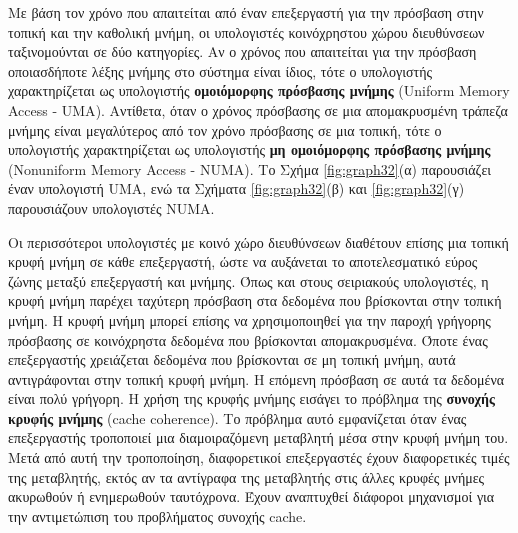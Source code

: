 \documentclass[12pt,a4paper]{article}
\begin{document}
Με βάση τον χρόνο που απαιτείται από έναν επεξεργαστή για την πρόσβαση στην 
τοπική και την καθολική μνήμη, οι υπολογιστές κοινόχρηστου χώρου διευθύνσεων 
ταξινομούνται σε δύο κατηγορίες. Αν ο χρόνος που απαιτείται για την 
πρόσβαση οποιασδήποτε λέξης μνήμης στο σύστημα είναι ίδιος, τότε ο 
υπολογιστής χαρακτηρίζεται ως υπολογιστής \textbf{ομοιόμορφης πρόσβασης 
μνήμης} (\foreignlanguage{english}{Uniform Memory Access - UMA}). Αντίθετα, όταν ο χρόνος 
πρόσβασης σε μια απομακρυσμένη τράπεζα μνήμης είναι μεγαλύτερος από τον 
χρόνο πρόσβασης σε μια τοπική, τότε ο υπολογιστής χαρακτηρίζεται ως 
υπολογιστής \textbf{μη ομοιόμορφης πρόσβασης μνήμης} (\foreignlanguage{english}{Nonuniform 
Memory Access - NUMA}). Το Σχήμα \ref{fig:graph32}(α) παρουσιάζει έναν υπολογιστή \foreignlanguage{english}{UMA}, 
ενώ τα Σχήματα \ref{fig:graph32}(β) και \ref{fig:graph32}(γ) παρουσιάζουν υπολογιστές \foreignlanguage{english}{NUMA}.

Οι περισσότεροι υπολογιστές με κοινό χώρο διευθύνσεων διαθέτουν επίσης 
μια τοπική κρυφή μνήμη σε κάθε επεξεργαστή, ώστε να αυξάνεται το αποτελεσματικό 
εύρος ζώνης μεταξύ επεξεργαστή και μνήμης. Όπως και στους σειριακούς 
υπολογιστές, η κρυφή μνήμη παρέχει ταχύτερη πρόσβαση στα δεδομένα που βρίσκονται 
στην τοπική μνήμη. Η κρυφή μνήμη μπορεί επίσης να χρησιμοποιηθεί για την παροχή 
γρήγορης πρόσβασης σε κοινόχρηστα δεδομένα που βρίσκονται απομακρυσμένα. 
Όποτε ένας επεξεργαστής χρειάζεται δεδομένα που βρίσκονται σε μη τοπική 
μνήμη, αυτά αντιγράφονται στην τοπική κρυφή μνήμη. Η επόμενη πρόσβαση σε αυτά 
τα δεδομένα είναι πολύ γρήγορη. Η χρήση της κρυφής μνήμης εισάγει το πρόβλημα της 
\textbf{συνοχής κρυφής μνήμης} (\foreignlanguage{english}{cache coherence}). Το πρόβλημα αυτό εμφανίζεται 
όταν ένας επεξεργαστής τροποποιεί μια διαμοιραζόμενη μεταβλητή μέσα στην 
κρυφή μνήμη του. Μετά από αυτή την τροποποίηση, διαφορετικοί επεξεργαστές έχουν 
διαφορετικές τιμές της μεταβλητής, εκτός αν τα αντίγραφα της μεταβλητής στις 
άλλες κρυφές μνήμες ακυρωθούν ή ενημερωθούν ταυτόχρονα. Έχουν αναπτυχθεί διάφοροι 
μηχανισμοί για την αντιμετώπιση του προβλήματος συνοχής \foreignlanguage{english}{cache}.
\end{document}
